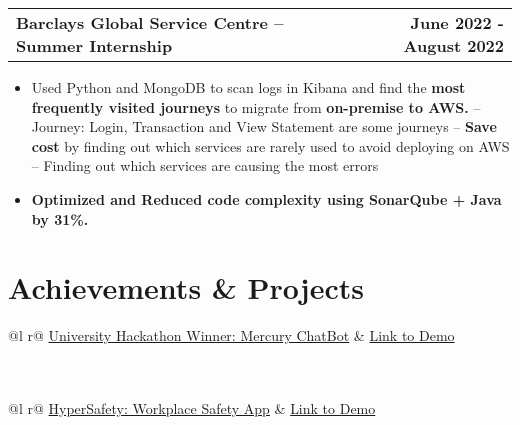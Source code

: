 \documentclass[letterpaper,12pt]{article}
\makeatletter
\newenvironment{joblong}[2]
    {
    \begin{tabularx}{\linewidth}{@{}l X r@{}}
    \textbf{#1} & \hfill &  #2 \\[3.75pt]
    \end{tabularx}
    \begin{minipage}[t]{\linewidth}
    \begin{itemize}[nosep,after=\strut, leftmargin=1em, itemsep=3pt,label=--]
    }
    {
    \end{itemize}
    \end{minipage}    
    }
\makeatother
\begin{document}
\begin{joblong}{Barclays Global Service Centre -- Summer Internship}{\textbf{June 2022 - August 2022}}
\item Used Python and MongoDB to scan logs in Kibana and find the \textbf{most frequently visited journeys} to migrate from \textbf{on-premise to AWS.}
\subitem -- Journey: Login, Transaction and View Statement are some journeys
\subitem -- \textbf{Save cost} by finding out which services are rarely used to avoid deploying on AWS
\subitem -- Finding out which services are causing the most errors
\item \textbf{Optimized and Reduced code complexity using SonarQube + Java by 31\%.}
\end{joblong}
  
\vspace{-13pt}
\section{Achievements \& Projects}

\begin{tabularx}{\linewidth}{ @{}l r@{} }
\href{https://github.com/ritviksharma4/My-Certificates/blob/main/My\%20Certificates/Ritvik\%20Sharma\%20SRM\%20Hackathon\%20Winner.pdf}{University Hackathon Winner: Mercury ChatBot} & \hfill \href{https://mercury.ritvik-sharma.com/}{Link to Demo} \\[3.75pt]
  \\
  \\
\end{tabularx}

\begin{tabularx}{\linewidth}{ @{}l r@{} }
\href{https://hypersafety.ritvik-sharma.com/}{HyperSafety: Workplace Safety App} & \hfill \href{https://www.youtube.com/watch?v=LwRyr8F4fns}{Link to Demo} \\[3.75pt]
  \\
  \\
\end{tabularx}
\end{document}
